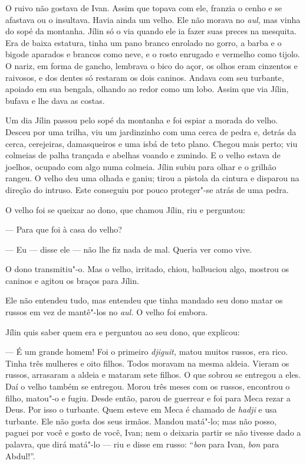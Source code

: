 O ruivo não gostava de Ivan. Assim que topava com ele, franzia o cenho e
se afastava ou o insultava. Havia ainda um velho. Ele não morava no
\emph{aul,} mas vinha do sopé da montanha. Jílin só o via quando ele ia
fazer suas preces na mesquita. Era de baixa estatura, tinha um pano
branco enrolado no gorro, a barba e o bigode aparados e brancos como
neve, e o rosto enrugado e vermelho como tijolo. O nariz, em forma de
gancho, lembrava o bico do açor, os olhos eram cinzentos e raivosos, e
dos dentes só restaram os dois caninos. Andava com seu turbante, apoiado
em sua bengala, olhando ao redor como um lobo. Assim que via Jílin,
bufava e lhe dava as costas.

Um dia Jílin passou pelo sopé da montanha e foi espiar a morada do
velho. Desceu por uma trilha, viu um jardinzinho com uma cerca de pedra
e, detrás da cerca, cerejeiras, damasqueiros e uma isbá de teto plano.
Chegou mais perto; viu colmeias de palha trançada e abelhas voando e
zunindo. E o velho estava de joelhos, ocupado com algo numa colmeia.
Jílin subiu para olhar e o grilhão rangeu. O velho deu uma olhada e
ganiu; tirou a pistola da cintura e disparou na direção do intruso. Este
conseguiu por pouco proteger"-se atrás de uma pedra.

O velho foi se queixar ao dono, que chamou Jílin, riu e perguntou:

--- Para que foi à casa do velho?

--- Eu --- disse ele --- não lhe fiz nada de mal. Queria ver como vive.

O dono transmitiu"-o. Mas o velho, irritado, chiou, balbuciou algo,
mostrou os caninos e agitou os braços para Jílin.

Ele não entendeu tudo, mas entendeu que tinha mandado seu dono matar os
russos em vez de mantê"-los no \emph{aul.} O velho foi embora.

Jílin quis saber quem era e perguntou ao seu dono, que explicou:

--- É um grande homem! Foi o primeiro \emph{djiguit,} matou muitos
russos, era rico. Tinha três mulheres e oito filhos. Todos moravam na
mesma aldeia. Vieram os russos, arrasaram a aldeia e mataram sete
filhos. O que sobrou se entregou a eles. Daí o velho também se entregou.
Morou três meses com os russos, encontrou o filho, matou"-o e fugiu.
Desde então, parou de guerrear e foi para Meca rezar a Deus. Por isso o
turbante. Quem esteve em Meca é chamado de \emph{hadji} e usa turbante.
Ele não gosta dos seus irmãos. Mandou matá"-lo; mas não posso, paguei por
você e gosto de você, Ivan; nem o deixaria partir se não tivesse dado a
palavra, que dirá matá"-lo --- riu e disse em russo: ``\emph{bon} para
Ivan, \emph{bon} para Abdul!''.

